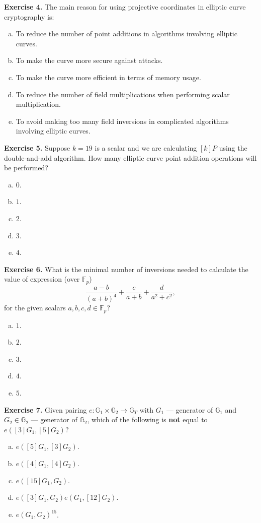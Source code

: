\documentclass[../lecture-notes.tex]{subfiles}
\begin{document}
\textbf{Exercise 4.} The main reason for using projective coordinates in elliptic curve cryptography is:
\begin{enumerate}[a)]
    \item To reduce the number of point additions in algorithms involving elliptic curves.
    \item To make the curve more secure against attacks.
    \item To make the curve more efficient in terms of memory usage.
    \item To reduce the number of field multiplications when performing scalar multiplication.
    \item To avoid making too many field inversions in complicated algorithms involving elliptic curves.
\end{enumerate}

\textbf{Exercise 5.} Suppose $k=19$ is a scalar and we are calculating $[k]P$ using the double-and-add algorithm. How many elliptic curve point addition operations will be performed?
\begin{enumerate}[a)]
    \item $0$.
    \item $1$.
    \item $2$.
    \item $3$.
    \item $4$.
\end{enumerate}

\textbf{Exercise 6.} What is the minimal number of inversions needed to calculate the value of expression (over $\mathbb{F}_p$)
\begin{equation*}
    \frac{a-b}{(a+b)^4} + \frac{c}{a+b} + \frac{d}{a^2+c^2},
\end{equation*}
for the given scalars $a,b,c,d \in \mathbb{F}_p$?
\begin{enumerate}[a)]
    \item $1$.
    \item $2$.
    \item $3$.
    \item $4$.
    \item $5$.
\end{enumerate}

\textbf{Exercise 7.} Given pairing $e: \mathbb{G}_1 \times \mathbb{G}_2 \to \mathbb{G}_T$ with $G_1$ --- generator of $\mathbb{G}_1$ and $G_2 \in \mathbb{G}_2$ --- generator of $\mathbb{G}_2$, which of the following is \textbf{not} equal to $e([3]G_1, [5]G_2)$?
\begin{enumerate}[a)]
    \item $e([5]G_1, [3]G_2)$.
    \item $e([4]G_1, [4]G_2)$.
    \item $e([15]G_1, G_2)$.
    \item $e([3]G_1,G_2)e(G_1,[12]G_2)$.
    \item $e(G_1, G_2)^{15}$.
\end{enumerate} 
\end{document}
